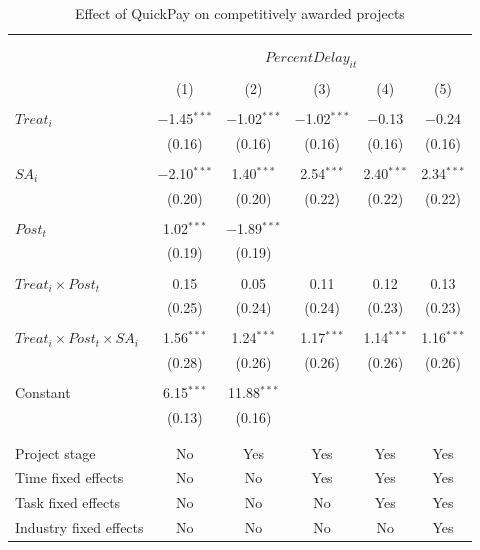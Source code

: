 \documentclass[
]{article}
\begin{document}
\begin{table}[H] \centering 
  \caption{Effect of QuickPay on competitively awarded projects} 
  \label{} 
\small 
\begin{tabular}{@{\extracolsep{-2pt}}lccccc} 
\\[-1.8ex]\hline 
\hline \\[-1.8ex] 
\\[-1.8ex] & \multicolumn{5}{c}{$PercentDelay_{it}$  } \\ 
\\[-1.8ex] & (1) & (2) & (3) & (4) & (5)\\ 
\hline \\[-1.8ex] 
 $Treat_i$ & $-$1.45$^{***}$ & $-$1.02$^{***}$ & $-$1.02$^{***}$ & $-$0.13 & $-$0.24 \\ 
  & (0.16) & (0.16) & (0.16) & (0.16) & (0.16) \\ 
  & & & & & \\ 
 $SA_i$ & $-$2.10$^{***}$ & 1.40$^{***}$ & 2.54$^{***}$ & 2.40$^{***}$ & 2.34$^{***}$ \\ 
  & (0.20) & (0.20) & (0.22) & (0.22) & (0.22) \\ 
  & & & & & \\ 
 $Post_t$ & 1.02$^{***}$ & $-$1.89$^{***}$ &  &  &  \\ 
  & (0.19) & (0.19) &  &  &  \\ 
  & & & & & \\ 
 $Treat_i \times Post_t$ & 0.15 & 0.05 & 0.11 & 0.12 & 0.13 \\ 
  & (0.25) & (0.24) & (0.24) & (0.23) & (0.23) \\ 
  & & & & & \\ 
 $Treat_i \times Post_t \times SA_i $ & 1.56$^{***}$ & 1.24$^{***}$ & 1.17$^{***}$ & 1.14$^{***}$ & 1.16$^{***}$ \\ 
  & (0.28) & (0.26) & (0.26) & (0.26) & (0.26) \\ 
  & & & & & \\ 
 Constant & 6.15$^{***}$ & 11.88$^{***}$ &  &  &  \\ 
  & (0.13) & (0.16) &  &  &  \\ 
  & & & & & \\ 
\hline \\[-1.8ex] 
Project stage & No & Yes & Yes & Yes & Yes \\ 
Time fixed effects & No & No & Yes & Yes & Yes \\ 
Task fixed effects & No & No & No & Yes & Yes \\ 
Industry fixed effects & No & No & No & No & Yes \\ 

\end{tabular}
\end{table}
\end{document}
